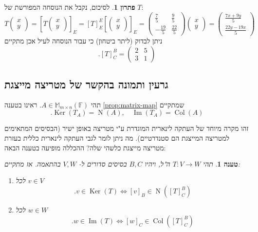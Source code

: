 \documentclass[12pt]{report}
\theoremstyle{plain}
\newtheorem{proposition}[theorem]{טענה}
\theoremstyle{definition}
\newtheorem*{solution}{פתרון}
\newcommand{\F}{\mathbb{F}}
\newcommand{\M}{\mathbb{M}}
\newcommand{\0}{\mathbf{0}}
\DeclareMathOperator{\Col}{Col}
\DeclareMathOperator{\Null}{N}
\DeclareMathOperator{\Ker}{Ker}
\DeclareMathOperator{\Image}{Im}
\begin{document}
\begin{solution}
לסיכום, נקבל את הנוסחה המפורשת של
$T$:
$$
T\begin{pmatrix}x\\y\end{pmatrix}=\left[T\begin{pmatrix}x\\y\end{pmatrix}\right]_E=[T]_E^E\left[\begin{pmatrix}x\\y\end{pmatrix}\right]_E=\begin{pmatrix}
\frac{7}{5} & \frac{9}{5} \\
-\frac{19}{5} & \frac{22}{5}
\end{pmatrix}\begin{pmatrix}x\\y\end{pmatrix}=\begin{pmatrix}\frac{7x+9y}{5} \\ \frac{22y-19x}{5}\end{pmatrix} 
$$
ניתן לבדוק (ליתר ביטחון) כי עבור הנוסחה לעיל אכן מתקיים
$$
.[T]_C^B=\begin{pmatrix}
2 & 5 \\
3 & 1
\end{pmatrix}
$$

\end{solution}

\subsection{גרעין ותמונה בהקשר של מטריצה מייצגת}

תהי
$A\in\M_{m\times n}(\F)$.
ראינו בטענה 
\ref{prop:matrix-map}
שמתקיים
$$
.\Ker(T_A)=\Null(A),\quad \Image(T_A)=\Col(A)
$$

זהו מקרה מיוחד של העתקה לינארית המוגדרת ע"י מטריצה באופן ישיר (הבסיסים המתאימים למטריצה המייצגת הם סטנדרטיים). מה ניתן לומר לגבי העתקה לינארית כללית בעזרת מטריצה מייצגת כלשהי שלה? ההכללה מופיעה בטענה הבאה:

\begin{proposition}\label{prop:ker-image-rep}
תהי
$T:V\to W$
ה"ל, ויהיו
$B,C$
בסיסים סדורים ל-
$V,W$
בהתאמה. אז מתקיים:
\begin{enumerate}[label=\alph*.]
\item 
לכל
$v\in V$
$$
.v\in\Ker(T) \iff [v]_B\in\Null([T]_C^B)
$$


\item 
לכל
$w\in W$
$$
.w\in\Image(T) \iff [w]_C\in\Col([T]_C^B)
$$


\end{enumerate}
\end{proposition}
\end{document}
